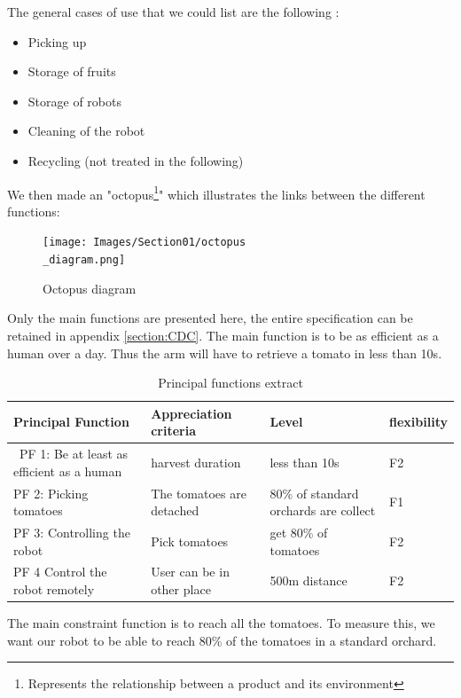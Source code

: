 \bigbreak
\noindent The general cases of use that we could list are the following : 
\begin{itemize}[noitemsep]
    \item Picking up
    \item Storage of fruits
    \item Storage of robots
    \item Cleaning of the robot
    \item Recycling (not treated in the following)
\end{itemize}

We then made an "\gls{octopus}\footnote{Represents the relationship between a product and its environment}" which illustrates the links between the different functions: 
\begin{figure}[ht]
    \centering
    \texttt{[image: Images/Section01/octopus\\\_diagram.png]}
    \caption{Octopus diagram}
    \label{fig:octopus}
\end{figure}

\bigbreak
Only the main functions are presented here, the entire specification can be retained in appendix \ref{section:CDC}. The main function is to be as efficient as a human over a day. Thus the arm will have to retrieve a tomato in less than 10s. 

\begin{table}[ht]
    \centering  
    \begin{tabular}{|p{3cm} | p{3cm} | p{3cm} | p{3cm} |} 
        \hline
        \textbf{Principal Function} & \textbf{Appreciation criteria} & \textbf{Level} & \textbf{flexibility} \\ [0.5ex] 
        \hline\
        PF 1: Be at least as efficient as a human & harvest duration & less than 10s & F2 \\ 
        \hline
        PF 2: Picking tomatoes & The tomatoes are detached & 80\% of standard orchards are collect & F1 \\
        \hline
        PF 3: Controlling the robot & Pick tomatoes & get 80\% of tomatoes & F2 \\
        \hline
        PF 4 Control the robot remotely  & User can be in other place & 500m distance & F2 \\
        \hline
    \end{tabular}
    \caption{Principal functions extract}
\end{table}
\FloatBarrier

\bigbreak
The main constraint function is to reach all the tomatoes. To measure this, we want our robot to be able to reach 80\% of the tomatoes in a standard orchard. 

